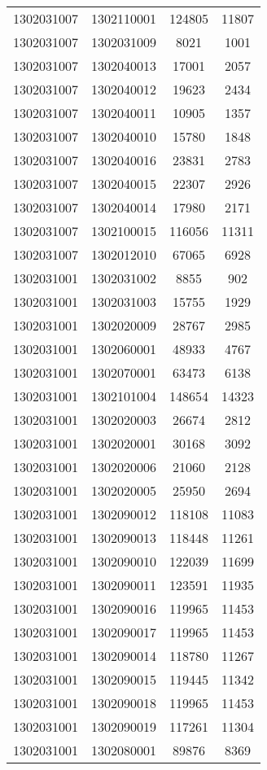 \begin{longtable}[h]{llcc}
		1302031007 & 1302110001 & 124805 & 11807\\
		1302031007 & 1302031009 & 8021 & 1001\\
		1302031007 & 1302040013 & 17001 & 2057\\
		1302031007 & 1302040012 & 19623 & 2434\\
		1302031007 & 1302040011 & 10905 & 1357\\
		1302031007 & 1302040010 & 15780 & 1848\\
		1302031007 & 1302040016 & 23831 & 2783\\
		1302031007 & 1302040015 & 22307 & 2926\\
		1302031007 & 1302040014 & 17980 & 2171\\
		1302031007 & 1302100015 & 116056 & 11311\\
		1302031007 & 1302012010 & 67065 & 6928\\
		1302031001 & 1302031002 & 8855 & 902\\
		1302031001 & 1302031003 & 15755 & 1929\\
		1302031001 & 1302020009 & 28767 & 2985\\
		1302031001 & 1302060001 & 48933 & 4767\\
		1302031001 & 1302070001 & 63473 & 6138\\
		1302031001 & 1302101004 & 148654 & 14323\\
		1302031001 & 1302020003 & 26674 & 2812\\
		1302031001 & 1302020001 & 30168 & 3092\\
		1302031001 & 1302020006 & 21060 & 2128\\
		1302031001 & 1302020005 & 25950 & 2694\\
		1302031001 & 1302090012 & 118108 & 11083\\
		1302031001 & 1302090013 & 118448 & 11261\\
		1302031001 & 1302090010 & 122039 & 11699\\
		1302031001 & 1302090011 & 123591 & 11935\\
		1302031001 & 1302090016 & 119965 & 11453\\
		1302031001 & 1302090017 & 119965 & 11453\\
		1302031001 & 1302090014 & 118780 & 11267\\
		1302031001 & 1302090015 & 119445 & 11342\\
		1302031001 & 1302090018 & 119965 & 11453\\
		1302031001 & 1302090019 & 117261 & 11304\\
		1302031001 & 1302080001 & 89876 & 8369\\

\end{longtable}
